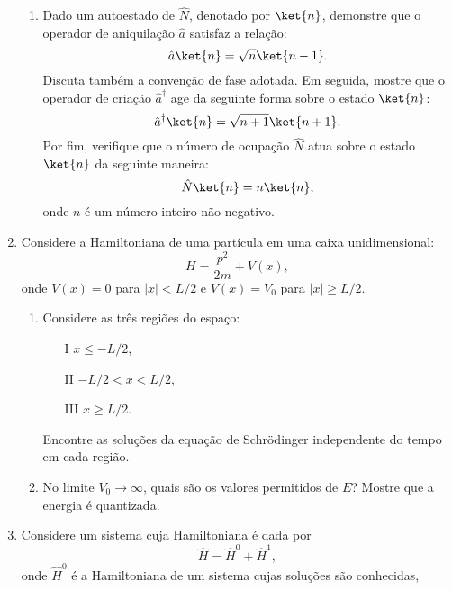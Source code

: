 \begin{enumerate}
\begin{enumerate}
              \item Dado um autoestado de $\hat{N}$, denotado por $\ket{n}$, demonstre que o operador de aniquilação $\hat{a}$ satisfaz a relação:
                    $$
                        \hat{a}\ket{n} = \sqrt{n}\ket{n-1}.
                    $$
                    Discuta também a convenção de fase adotada.
                    Em seguida, mostre que o operador de criação $\hat{a}^\dagger$ age da seguinte forma sobre o estado $\ket{n}$:
                    $$
                        \hat{a}^\dagger\ket{n} = \sqrt{n+1}\ket{n+1}.
                    $$
                    Por fim, verifique que o número de ocupação $\hat{N}$ atua sobre o estado $\ket{n}$ da seguinte maneira:
                    $$
                        \hat{N}\ket{n} = n\ket{n},
                    $$
                    onde $n$ é um número inteiro não negativo.
          \end{enumerate}
    \item Considere a Hamiltoniana de uma partícula em uma caixa unidimensional:
          \begin{equation*}
              H = \frac{p^2}{2m} + V(x),
          \end{equation*}
          onde $V(x) = 0$ para $|x| < L/2$ e $V(x) = V_0$ para $|x| \geq L/2$.
          \begin{enumerate}
              \item Considere as três regiões do espaço:
                    \begin{enumerate}
                        \item[I] $x \leq -L/2$,
                        \item[II] $-L/2 < x < L/2$,
                        \item[III] $x \geq L/2$.
                    \end{enumerate}
                    Encontre as soluções da equação de Schrödinger independente do tempo em cada
                    região.
              \item No limite $V_0\to\infty$, quais são os valores permitidos de $E$? Mostre que a energia é quantizada.
          \end{enumerate}
    \item Considere um sistema cuja Hamiltoniana é dada por
          \begin{equation*}
              \hat{H} = \hat{H}^0 + \hat{H}^1,
          \end{equation*}
          onde $\hat{H}^0$ é a Hamiltoniana de um sistema cujas soluções são conhecidas,

\end{enumerate}
